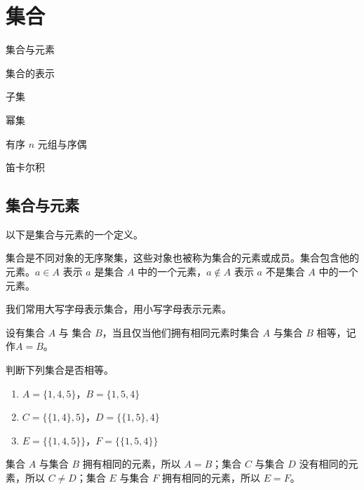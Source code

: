 \section{集合}
\begin{introduction}
    \item 集合与元素
    \item 集合的表示
    \item 子集
    \item 幂集
    \item 有序 $n$ 元组与序偶
    \item 笛卡尔积
\end{introduction}

\subsection{集合与元素}
以下是集合与元素的一个定义。
\begin{definition}[集合与元素]\label{def:集合与元素}
    集合是不同对象的无序聚集，这些对象也被称为集合的元素或成员。集合包含他的元素。$a \in A$ 表示 $a$ 是集合 $A$ 中的一个元素，$a \notin A$ 表示 $a$ 不是集合 $A$ 中的一个元素。
\end{definition}

我们常用大写字母表示集合，用小写字母表示元素。
\begin{definition}[相等的集合]\label{def:相等的集合}
    设有集合 $A$ 与 集合 $B$，当且仅当他们拥有相同元素时集合 $A$ 与集合 $B$ 相等，记作$A = B$。
\end{definition}

\begin{collections}
    \begin{example}
        判断下列集合是否相等。
        \begin{enumerate}
            \item $A = \{ 1, 4, 5 \}$，$B = \{ 1, 5 ,4 \}$
            \item $C = \{ \{ 1, 4 \}, 5 \}$，$D = \{ \{ 1, 5 \}, 4 \}$
            \item $E = \{ \{ 1, 4, 5 \} \}$，$F = \{ \{ 1, 5, 4 \} \}$
        \end{enumerate}
    \end{example}
    \begin{solution}
        集合 $A$ 与集合 $B$ 拥有相同的元素，所以 $A = B$；集合 $C$ 与集合 $D$ 没有相同的元素，所以 $C \neq D$；集合 $E$ 与集合 $F$ 拥有相同的元素，所以 $E = F$。
    \end{solution}
\end{collections}

